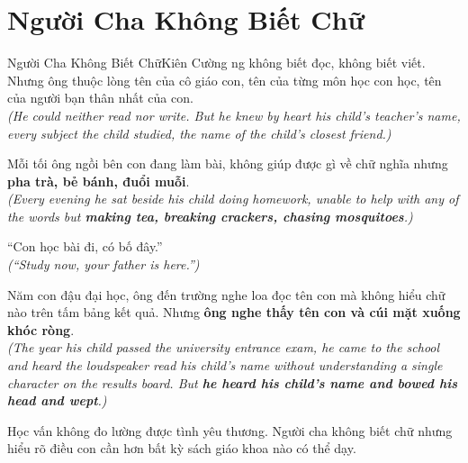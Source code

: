 \section{Người Cha Không Biết Chữ}
\begin{truyen}{Người Cha Không Biết Chữ}{Kiên Cường}
ng không biết đọc, không biết viết. Nhưng ông thuộc lòng tên của cô giáo con, tên của từng môn học con học, tên của người bạn thân nhất của con.\\
\textit{(He could neither read nor write. But he knew by heart his child's teacher's name, every subject the child studied, the name of the child's closest friend.)}

Mỗi tối ông ngồi bên con đang làm bài, không giúp được gì về chữ nghĩa nhưng \textbf{pha trà, bẻ bánh, đuổi muỗi}.\\
\textit{(Every evening he sat beside his child doing homework, unable to help with any of the words but \textbf{making tea, breaking crackers, chasing mosquitoes}.)}

``Con học bài đi, có bố đây.''\\
\textit{(``Study now, your father is here.'')}

Năm con đậu đại học, ông đến trường nghe loa đọc tên con mà không hiểu chữ nào trên tấm bảng kết quả. Nhưng \textbf{ông nghe thấy tên con và cúi mặt xuống khóc ròng}.\\
\textit{(The year his child passed the university entrance exam, he came to the school and heard the loudspeaker read his child's name without understanding a single character on the results board. But \textbf{he heard his child's name and bowed his head and wept}.)}
\end{truyen}
\begin{baihoc}
  Học vấn không đo lường được tình yêu thương. Người cha không biết chữ nhưng hiểu rõ điều con cần hơn bất kỳ sách giáo khoa nào có thể dạy.
\end{baihoc}

